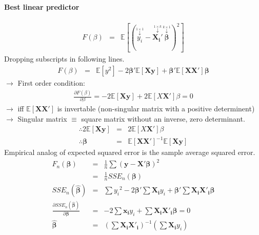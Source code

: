 \paragraph{Best linear predictor}
\begin{eqnarray*}
F(\beta)&=&\mathbb{E}[(\overset{\overset{1\times 1}{\downarrow}}{y_{i}}-\overset{\overset{1\times k}{\downarrow}}{\boldsymbol{X_{i}'}}\overset{\overset{k\times 1}{\downarrow}}{\boldsymbol{\beta}})^2]
\end{eqnarray*}
Dropping subscripts in following lines.
\begin{eqnarray*}
F(\beta)&=&\mathbb{E}[y^2] - 2\boldsymbol{\beta}'\mathbb{E}[\boldsymbol{Xy}] + \boldsymbol{\beta}'\mathbb{E}[\boldsymbol{XX'}]\boldsymbol{\beta}
\end{eqnarray*}
$\to$ First order condition:
\begin{eqnarray*}
\frac{\partial F(\beta)}{\partial \beta} = -2\mathbb{E}[\boldsymbol{Xy}] + 2\mathbb{E}[X\boldsymbol{X'}]\beta = 0
\end{eqnarray*}
$\to$ iff $\mathbb{E}[\boldsymbol{XX'}]$ is invertable (non-singular matrix with a positive determinent)\\
$\to$ Singular matrix $\equiv$ square matrix without an inverse, zero determinant.
\begin{eqnarray*}
\therefore 2\mathbb{E}[\boldsymbol{Xy}] &=& 2\mathbb{E}[X\boldsymbol{X'}]\beta\\
\therefore \boldsymbol{\beta} &=& \mathbb{E}[\boldsymbol{XX'}]^{-1}\mathbb{E}[\boldsymbol{Xy}]
\end{eqnarray*}
Empirical analog of expected squared error is the sample average squared error.
\begin{eqnarray*}
F_n(\boldsymbol{\beta}) &=& \frac{1}{n}\sum(\boldsymbol{y}-\boldsymbol{X'\beta})^2\\
&=& \frac{1}{n} SSE_n(\boldsymbol{\beta})\\
SSE_n(\boldsymbol{\hat{\beta}}) &=& \sum{y_i}^2 - 2\boldsymbol{\beta'}\sum\boldsymbol{X_{i}}y_{i} + \boldsymbol{\beta'}\sum\boldsymbol{{X_i}{X'_i}\beta}\\
\frac{\partial SSE_n(\boldsymbol{\hat{\beta}})}{\partial \boldsymbol{\beta}} &=& -2\sum\boldsymbol{x_{i}}y_{i} + \sum\boldsymbol{X_{i}X'_{i}\beta} = 0\\
\boldsymbol{\hat{\beta}} &=& (\sum\boldsymbol{X_{i}X'_{i}})^{-1}(\sum\boldsymbol{X_{i}}y_{i})
\end{eqnarray*}

